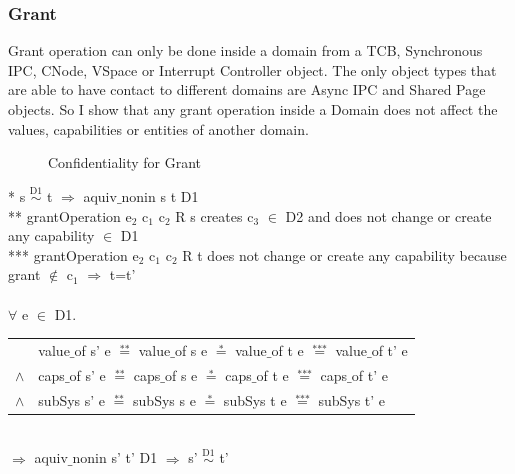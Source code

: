 \documentclass[pdftex,11pt,a4paper]{article}
\begin{document}
\subsubsection{Grant}\label{sec:Grant}
Grant operation can only be done inside a domain from a TCB, Synchronous IPC, CNode, VSpace or Interrupt Controller object. The only object types that are able to have contact to different domains are Async IPC and Shared Page objects. So I  show that any grant operation inside a Domain does not affect the values, capabilities or entities of another domain. 
\begin{flushleft}
\begin{figure}[H]
\caption{Confidentiality for Grant}
\end{figure}
\end{flushleft}
* s $\overset{\text{D1}}{\sim}$ t $\Rightarrow$ aquiv$\_$nonin s t D1	\\ 
** grantOperation e$_2$ c$_1$ c$_2$ R s creates c$_3$ $\in$ D2 and does not change or create any capability $\in$ D1 \\ 
*** grantOperation e$_2$ c$_1$ c$_2$ R t does not change or create any capability because grant $\notin$ c$_1$ $\Rightarrow$ t=t' \\ \\
$\forall$ e $\in$ D1. \\ 
\begin{tabular}{ll}
& value$\_$of s' e $\overset{\text{**}}{=}$ value$\_$of s e $\overset{\text{*}}{=}$ value$\_$of t e $\overset{\text{***}}{=}$ value$\_$of t' e \\
$\wedge$ & caps$\_$of s' e $\overset{\text{**}}{=}$ caps$\_$of s e $\overset{\text{*}}{=}$ caps$\_$of t e $\overset{\text{***}}{=}$ caps$\_$of t' e \\
$\wedge$ & subSys s' e $\overset{\text{**}}{=}$ subSys s e $\overset{\text{*}}{=}$ subSys t e $\overset{\text{***}}{=}$ subSys t' e
\end{tabular} \\
$\Rightarrow$ aquiv$\_$nonin s' t' D1 $\Rightarrow$ s' $\overset{\text{D1}}{\sim}$ t'
	\cleardoublepage
\end{document}
